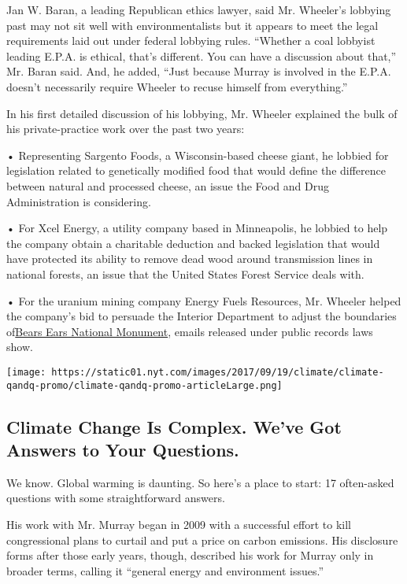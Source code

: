 Jan W. Baran, a leading Republican ethics lawyer, said Mr. Wheeler's
lobbying past may not sit well with environmentalists but it appears to
meet the legal requirements laid out under federal lobbying rules.
``Whether a coal lobbyist leading E.P.A. is ethical, that's different.
You can have a discussion about that,'' Mr. Baran said. And, he added,
``Just because Murray is involved in the E.P.A. doesn't necessarily
require Wheeler to recuse himself from everything.''

In his first detailed discussion of his lobbying, Mr. Wheeler explained
the bulk of his private-practice work over the past two years:

• Representing Sargento Foods, a Wisconsin-based cheese giant, he
lobbied for legislation related to genetically modified food that would
define the difference between natural and processed cheese, an issue the
Food and Drug Administration is considering.

• For Xcel Energy, a utility company based in Minneapolis, he lobbied to
help the company obtain a charitable deduction and backed legislation
that would have protected its ability to remove dead wood around
transmission lines in national forests, an issue that the United States
Forest Service deals with.

• For the uranium mining company Energy Fuels Resources, Mr. Wheeler
helped the company's bid to persuade the Interior Department to adjust
the boundaries
of\href{https://www.nytimes.com/2018/03/02/climate/bears-ears-national-monument.html}{Bears
Ears National Monument}, emails released under public records laws show.

\href{https://www.nytimes.com/interactive/2017/climate/what-is-climate-change.html}{}

\texttt{[image: https://static01.nyt.com/images/2017/09/19/climate/climate-qandq-promo/climate-qandq-promo-articleLarge.png]}

\hypertarget{climate-change-is-complex-weve-got-answers-to-your-questions}{%
\subsection{Climate Change Is Complex. We've Got Answers to Your
Questions.}\label{climate-change-is-complex-weve-got-answers-to-your-questions}}

We know. Global warming is daunting. So here's a place to start: 17
often-asked questions with some straightforward answers.

His work with Mr. Murray began in 2009 with a successful effort to kill
congressional plans to curtail and put a price on carbon emissions. His
disclosure forms after those early years, though, described his work for
Murray only in broader terms, calling it ``general energy and
environment issues.''

